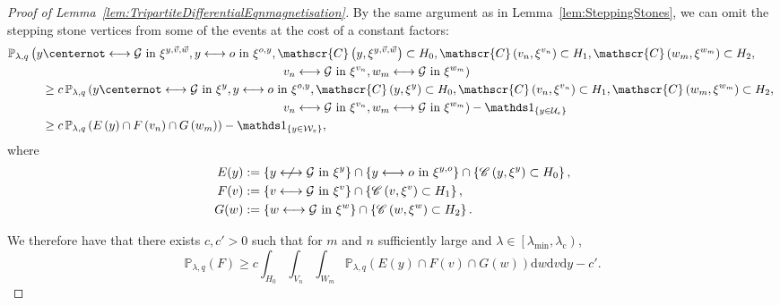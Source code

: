 \documentclass[10pt,a4paper,dvipsnames]{article}
\theoremstyle{definition}
\theoremstyle{remark}
\newcommand{\plaq}{\mathbb{P}_{\lambda,q}}
\newcommand{\Ucal}{\mathcal{U}}
\newcommand{\Wcal}{\mathcal{W}}
\newcommand{\dd}{\mathrm{d}} %
\newcommand{\C}{\mathscr {C}}
\newcommand{\Gcal}{\mathcal{G}}
\newcommand{\conn}[3]{#1 \longleftrightarrow #2\textrm { in } #3}
\newcommand{\nconn}[3]{#1 \centernot\longleftrightarrow #2\textrm { in } #3}
\newcommand{\Id}{\mathds 1}
\newcommand{\orig}{o}
\numberwithin{equation}{section}
\begin{document}
\begin{proof}[Proof of Lemma~\ref{lem:TripartiteDifferentialEqnmagnetisation}]
By the same argument as in Lemma~\ref{lem:SteppingStones}, we can omit the stepping stone vertices from some of the events at the cost of a constant factors:
\begin{align}
        &\plaq\left(\nconn{y}{\Gcal}{\xi^{y,\vec{v},\vec{w}}},\conn{y}{\orig}{\xi^{\orig,y}},\C\left(y,\xi^{y,\vec{v},\vec{w}}\right)\subset H_0, \C\left(v_n,\xi^{v_n}\right)\subset H_1, \C\left(w_m,\xi^{w_m}\right)\subset H_2,\right.\nonumber\\
        &\hspace{8cm} \left.\conn{v_n}{\Gcal}{\xi^{v_n}},\conn{w_m}{\Gcal}{\xi^{w_m}}\right)\nonumber\\
        &\hspace{1cm} \geq c\,\plaq\left(\nconn{y}{\Gcal}{\xi^{y}},\conn{y}{\orig}{\xi^{\orig,y}},\C\left(y,\xi^{y}\right)\subset H_0, \C\left(v_n,\xi^{v_n}\right)\subset H_1, \C\left(w_m,\xi^{w_m}\right)\subset H_2,\right.\nonumber\\
        &\hspace{8cm} \left.\conn{v_n}{\Gcal}{\xi^{v_n}},\conn{w_m}{\Gcal}{\xi^{w_m}}\right) - \Id_{\left\{y\in\Ucal_\varepsilon\right\}}\nonumber\\
        &\hspace{1cm} \geq c\,\plaq\left(E\left(y\right)\cap F\left(v_n\right)\cap G\left(w_m\right)\right) - \Id_{\left\{y\in\Wcal_\varepsilon\right\}},
\end{align}
where 
\begin{align}
    E(y) &:= \left\{\nconn{y}{\Gcal}{\xi^y}\right\}\cap\left\{\conn{y}{\orig}{\xi^{y,\orig}}\right\}\cap\left\{\C\left(y,\xi^y\right)\subset H_0\right\},\\
    F(v) &:= \left\{\conn{v}{\Gcal}{\xi^v}\right\}\cap \left\{\C\left(v,\xi^v\right)\subset H_1\right\},\\
    G(w) &:= \left\{\conn{w}{\Gcal}{\xi^w}\right\}\cap \left\{\C\left(w,\xi^w\right)\subset H_2\right\}.
\end{align}


We therefore have that there exists $c,c'>0$ such that for $m$ and $n$ sufficiently large and $\lambda\in\left[\lambda_{\min},\lambda_\mathrm{c}\right)$,
\begin{equation}\label{eq:EFGintBd}
    \plaq\left(F\right) \geq c\int_{H_0}\int_{V_n}\int_{W_m}\plaq\left(E\left(y\right)\cap F\left(v\right)\cap G\left(w\right)\right)\dd w \dd v\dd y - c'.
\end{equation}


\end{proof}
\end{document}
